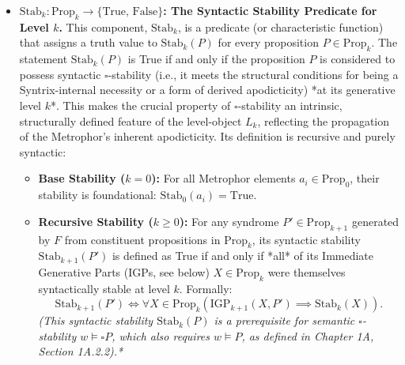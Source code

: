 \documentclass[
    12pt,              %
    a4paper,           %
    headings=normal,   %
    twoside=true,      %
    BCOR=8mm,          %
]{scrbook}
\newcommand{\BoxSyn}{\square}
\newcommand{\Propk}[1]{\text{Prop}_{#1}}
\newcommand{\IGPk}[1]{\text{IGP}_{#1}}
\begin{document}
\begin{itemize}
    \item   \textbf{\(\text{Stab}_k: \text{Prop}_k \to \{\text{True, False}\}\): The Syntactic Stability Predicate for Level \(k\).}
        This component, \(\text{Stab}_k\), is a predicate (or characteristic function) that assigns a truth value to \(\text{Stab}_k(P)\) for every proposition \(P \in \text{Prop}_k\). The statement \(\text{Stab}_k(P)\) is True if and only if the proposition \(P\) is considered to possess syntactic \(\BoxSyn\)-stability (i.e., it meets the structural conditions for being a Syntrix-internal necessity or a form of derived apodicticity) *at its generative level \(k\)*. This makes the crucial property of \(\BoxSyn\)-stability an intrinsic, structurally defined feature of the level-object \(L_k\), reflecting the propagation of the Metrophor's inherent apodicticity. Its definition is recursive and purely syntactic:
        \begin{itemize}
            \item   \textbf{Base Stability (\(k=0\)):} For all Metrophor elements \(a_i \in \text{Prop}_0\), their stability is foundational: \(\text{Stab}_0(a_i) = \text{True}\).
            \item   \textbf{Recursive Stability (\(k \ge 0\)):} For any syndrome \(P' \in \text{Prop}_{k+1}\) generated by \(F\) from constituent propositions in \(\text{Prop}_k\), its syntactic stability \(\text{Stab}_{k+1}(P')\) is defined as True if and only if *all* of its Immediate Generative Parts (IGPs, see below) \(X \in \text{Prop}_k\) were themselves syntactically stable at level \(k\). Formally:
                \[ \text{Stab}_{k+1}(P') \iff \forall X \in \Propk{k} \left( \IGPk{k+1}(X, P') \implies \text{Stab}_k(X) \right). \]
                \textit{(This syntactic stability \(\text{Stab}_k(P)\) is a prerequisite for semantic \(\BoxSyn\)-stability \(w \vDash \BoxSyn P\), which also requires \(w \vDash P\), as defined in Chapter 1A, Section 1A.2.2).*}
        \end{itemize}


\end{itemize}
\end{document}
